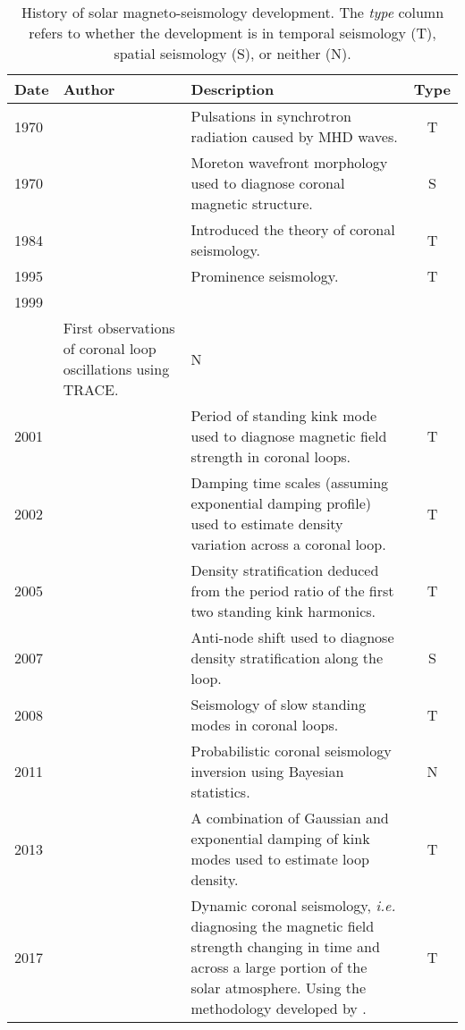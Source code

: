 \documentclass[12pt]{../style-files/ociamthesis}
\begin{document}
\begin{table}
	\centering
	\begin{tabularx}{\linewidth}{l l X c}
		\toprule
		Date & Author & Description & Type \\
		\midrule
		1970 & \citeauthor{ros70} & Pulsations in synchrotron radiation caused by MHD waves. & T \\
		1970 & \citeauthor{uch70} & Moreton wavefront morphology used to diagnose coronal magnetic structure. & S \\
		1984 & \citeauthor{rob_etal84} & Introduced the theory of coronal seismology. & T \\
		1995 & \citeauthor{tan95} & Prominence seismology. & T \\
		1999 & \makecell[tl]{\citeauthor{asc_etal99} \\ \citeauthor{nak_etal99}}  & First observations of coronal loop oscillations using TRACE. & N \\
		2001 & \citetalias{nak_etal01} & Period of standing kink mode used to diagnose magnetic field strength in coronal loops. & T \\
		2002 & \citeauthor{goo_etal02} & Damping time scales (assuming exponential damping profile) used to estimate density variation across a coronal loop. & T \\
		2005 & \citeauthor{and_etal05} & Density stratification deduced from the period ratio of the first two standing kink harmonics. & T \\
		2007 & \citeauthor{ver_etal07} & Anti-node shift used to diagnose density stratification along the loop. & S \\
		2008 & \citetalias{erd_etal08} & Seismology of slow standing modes in coronal loops. & T \\
		2011 & \citetalias{arr_etal11} & Probabilistic coronal seismology inversion using Bayesian statistics. & N \\
		2013 & \citeauthor{pas_etal13} & A combination of Gaussian and exponential damping of kink modes used to estimate loop density. & T \\
		2017 & \citeauthor{lon_etal17} & Dynamic coronal seismology, \textit{i.e.} diagnosing the magnetic field strength changing in time and across a large portion of the solar atmosphere. Using the methodology developed by \cite{mor_etal15}. & T \\
		\bottomrule
	\end{tabularx}
	\caption{History of solar magneto-seismology development. The \textit{type} column refers to whether the development is in temporal seismology (T), spatial seismology (S), or neither (N).}
	\label{table: SMS history}
\end{table}
\end{document}
